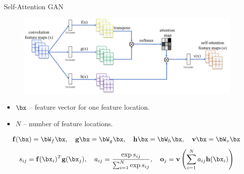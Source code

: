 \begin{frame}{Self-Attention GAN}
	\begin{figure}
		\centering
		\includegraphics[width=0.9\linewidth]{figs/self-attention}
	\end{figure}
	\vspace{-0.2cm}
	\begin{itemize}
		\item $\bx$ -- feature vector for one feature location.
		\item $N$ -- number of feature locations.
	\end{itemize}
	\vspace{0.5cm}
	\[
		\mathbf{f}(\bx) = \bW_f \bx, \quad \mathbf{g}\bx = \bW_g\bx, \quad \mathbf{h}\bx = \bW_h\bx, \quad \mathbf{v}\bx = \bW_v\bx
	\]
	\[
		s_{ij} = \mathbf{f}(\bx_i)^T \mathbf{g}(\bx_j), \quad a_{ij} = \frac{\exp{s_{ij}}}{\sum_{i=1}^N \exp{s_{ij}}}, \quad \textbf{o}_j = \textbf{v}\left( \sum_{i=1}^N a_{ij} \mathbf{h}(\bx_i) \right)
	\]
\end{frame}
